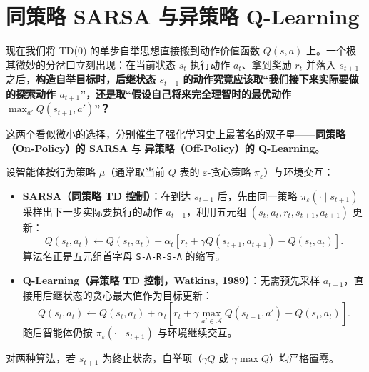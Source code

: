 \section{同策略 SARSA 与异策略 Q-Learning}
\label{sec:rl-sarsa-q}

现在我们将 TD(0) 的单步自举思想直接搬到动作价值函数 $Q(s, a)$ 上。一个极其微妙的分岔口立刻出现：在当前状态 $s_t$ 执行动作 $a_t$、拿到奖励 $r_t$ 并落入 $s_{t+1}$ 之后，\textbf{构造自举目标时，后继状态 $s_{t+1}$ 的动作究竟应该取“我们接下来实际要做的探索动作 $a_{t+1}$”，还是取“假设自己将来完全理智时的最优动作 $\max_{a'} Q(s_{t+1}, a')$”？}

这两个看似微小的选择，分别催生了强化学习史上最著名的双子星——\textbf{同策略（On-Policy）的 SARSA} 与 \textbf{异策略（Off-Policy）的 Q-Learning}。

\begin{defBox}
\begin{definition}
设智能体按行为策略 $\mu$（通常取当前 $Q$ 表的 $\varepsilon$-贪心策略 $\pi_\varepsilon$）与环境交互：
\begin{itemize}
  \item \textbf{SARSA（同策略 TD 控制）}：在到达 $s_{t+1}$ 后，先由同一策略 $\pi_\varepsilon(\cdot \mid s_{t+1})$ 采样出下一步实际要执行的动作 $a_{t+1}$，利用五元组 $(s_t, a_t, r_t, s_{t+1}, a_{t+1})$ 更新：
  \begin{equation}
    Q(s_t, a_t) \leftarrow Q(s_t, a_t) + \alpha_t \!\left[r_t + \gamma Q(s_{t+1}, a_{t+1}) - Q(s_t, a_t)\right].
    \label{eq:sarsa}
  \end{equation}
  算法名正是五元组首字母 \texttt{S-A-R-S-A} 的缩写。
  \item \textbf{Q-Learning（异策略 TD 控制，Watkins, 1989）}：无需预先采样 $a_{t+1}$，直接用后继状态的贪心最大值作为目标更新：
  \begin{equation}
    Q(s_t, a_t) \leftarrow Q(s_t, a_t) + \alpha_t \!\left[r_t + \gamma \max_{a' \in \mathcal{A}} Q(s_{t+1}, a') - Q(s_t, a_t)\right].
    \label{eq:qlearning}
  \end{equation}
  随后智能体仍按 $\pi_\varepsilon(\cdot \mid s_{t+1})$ 与环境继续交互。
\end{itemize}
对两种算法，若 $s_{t+1}$ 为终止状态，自举项（$\gamma Q$ 或 $\gamma \max Q$）均严格置零。
\end{definition}
\end{defBox}

